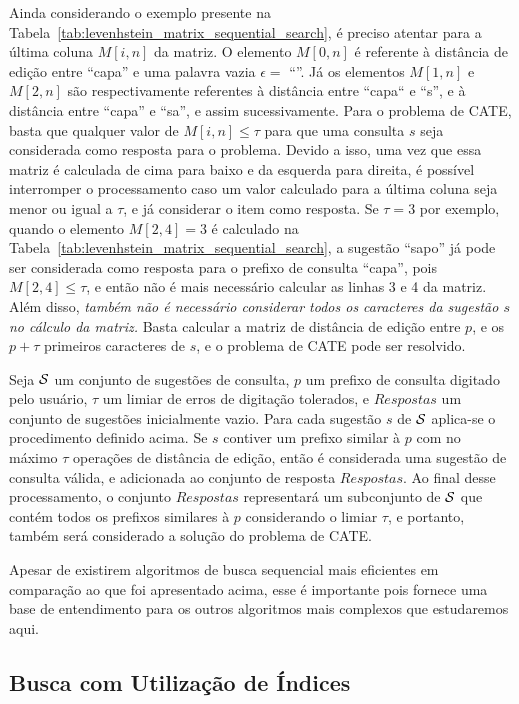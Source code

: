 Ainda considerando o exemplo presente na Tabela~\ref{tab:levenhstein_matrix_sequential_search}, é preciso atentar para a última coluna $M[i, n]$ da matriz. O elemento $M[0, n]$ é referente à distância de edição entre ``capa'' e uma palavra vazia $\epsilon=$ ``''. Já os elementos $M[1, n]$ e $M[2, n]$ são respectivamente referentes à distância entre ``capa`` e ``s'', e à distância entre ``capa'' e ``sa'', e assim sucessivamente. Para o problema de CATE, basta que qualquer valor de $M[i, n] \leq \tau$ para que uma consulta $s$ seja considerada como resposta para o problema. Devido a isso, uma vez que essa matriz é calculada de cima para baixo e da esquerda para direita, é possível interromper o processamento caso um valor calculado para a última coluna seja menor ou igual a $\tau$, e já considerar o item como resposta. Se $\tau = 3$ por exemplo, quando o elemento $M[2, 4] = 3$ é calculado na Tabela~\ref{tab:levenhstein_matrix_sequential_search}, a sugestão ``sapo'' já pode ser considerada como resposta para o prefixo de consulta ``capa'', pois $M[2, 4] \leq \tau$, e então não é mais necessário calcular as linhas 3 e 4 da matriz. Além disso, \textit{também não é necessário considerar todos os caracteres da sugestão $s$ no cálculo da matriz.} Basta calcular a matriz de distância de edição entre $p$, e os $p + \tau$ primeiros caracteres de $s$, e o problema de CATE pode ser resolvido.

Seja $\mathcal{S}$ um conjunto de sugestões de consulta, $p$ um prefixo de consulta digitado pelo usuário, $\tau$ um limiar de erros de digitação tolerados, e $Respostas$ um conjunto de sugestões inicialmente vazio. Para cada sugestão $s$ de $\mathcal{S}$ aplica-se o procedimento definido acima. Se $s$ contiver um prefixo similar à $p$ com no máximo $\tau$ operações de distância de edição, então é considerada uma sugestão de consulta válida, e adicionada ao conjunto de resposta $Respostas$. Ao final desse processamento, o conjunto $Respostas$ representará um subconjunto de $\mathcal{S}$ que contém todos os prefixos similares à $p$ considerando o limiar $\tau$, e portanto, também será considerado a solução do problema de CATE.

Apesar de existirem algoritmos de busca sequencial mais eficientes em comparação ao que foi apresentado acima, esse é importante pois fornece uma base de entendimento para os outros algoritmos mais complexos que estudaremos aqui.

\subsection{Busca com Utilização de Índices}

